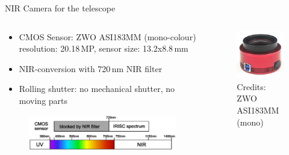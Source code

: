 \documentclass[11pt, aspectratio=169]{beamer}
\begin{document}
\begin{frame}{NIR Camera for the telescope}
    \vspace{-0.2cm}
    \begin{columns}[t]
    \begin{column}{0.6\textwidth}
        \begin{itemize}
            \item CMOS Sensor: ZWO ASI183MM (mono-colour) \\
                resolution: 20.18\,MP, sensor size: 13.2x8.8\,mm
            \item NIR-conversion with 720\,nm NIR filter
            \item Rolling shutter: no mechanical shutter, no moving parts
        \end{itemize}
        \vspace{-0.7cm}
        \begin{figure}
        \centering
        \includegraphics[width = 1.1\linewidth]{figures/images/IRISC_spectrum.eps}
    \end{figure}
    \end{column}
    \begin{column}{0.4\textwidth}
        \begin{figure}[t]
            \centering
            \includegraphics[width=0.7\linewidth]{figures/images/ZWO_ASI183MM.jpg}
            \caption*{Credits: ZWO ASI183MM (mono)}
            \label{fig::NIR_sensor}
        \end{figure}
    \end{column}
    \end{columns}
\end{frame}
\end{document}
